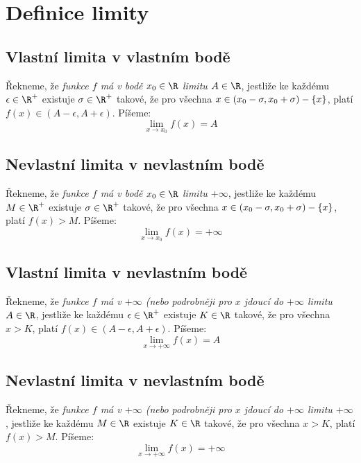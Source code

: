 
\BeginDoc{}
\def\posloup{$\zs{a_n}_{n=1}^{\infty}$}
\def\pos#1{\zs{#1}_{n=1}^{\infty}}
\def\li{\lim_{n\rightarrow\infty}}
\def\sup{{\rm sup\ }}
\def\sciwinfup{{\rm inf\ }}
\def\su{\sum_{n=1}^{\infty}}
\section{Definice limity}
\subsection{Vlastní limita v vlastním bodě}

\Def Řekneme, že \emph{funkce $f$ má v bodě $x_0\in\R$ limitu $A\in\R$},
jestliže ke každému $\epsilon \in \R^+$ existuje $\sigma \in\R^+$ takové, že pro všechna $x\in(x_0-\sigma,x_0+\sigma)-\left\{{x}\right\}$,
platí $f(x) \in (A-\epsilon,A+\epsilon)$. Píšeme:
$$\lim_{x\rightarrow x_0} f(x) = A$$

\subsection{Nevlastní limita v nevlastním bodě}

\Def Řekneme, že \emph{funkce $f$ má v bodě $x_0\in\R$ limitu $+\infty$},
jestliže ke každému $M \in \R^+$ existuje $\sigma \in\R^+$ takové, že pro všechna $x\in(x_0-\sigma,x_0+\sigma)-\left\{{x}\right\}$,
platí $f(x) > M$. Píšeme:
$$\lim_{x\rightarrow x_0} f(x) = +\infty$$

\subsection{Vlastní limita v nevlastním bodě}

\Def Řekneme, že \emph{funkce $f$ má v $+\infty$ (nebo podrobněji pro $x$ jdoucí do $+\infty$ limitu $A\in\R$},
jestliže ke každému $\epsilon \in \R^+$ existuje $K \in\R$ takové, že pro všechna $x>K$,
platí $f(x) \in (A-\epsilon,A+\epsilon)$. Píšeme:
$$\lim_{x\rightarrow +\infty} f(x) = A$$

\subsection{Nevlastní limita v nevlastním bodě}

\Def Řekneme, že \emph{funkce $f$ má v $+\infty$ (nebo podrobněji pro $x$ jdoucí do $+\infty$ limitu $+\infty$},
jestliže ke každému $M \in \R$ existuje $K \in\R$ takové, že pro všechna $x>K$,
platí $f(x) > M$. Píšeme:
$$\lim_{x\rightarrow +\infty} f(x) = +\infty$$
\EndDoc
